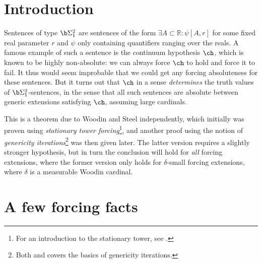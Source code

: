 \newcommand{\mytitle}{$\bf\Sigma^2_1$-absoluteness}
%
%




\section{Introduction}

Sentences of type $\b\Sigma^2_1$ are sentences of the form $\exists A\subset\mathbb R\colon\psi[A,r]$ for some fixed real parameter $r$ and $\psi$ only containing quantifiers ranging over the reals. A famous example of such a sentence is the continuum hypothesis $\ch$, which is known to be highly non-absolute: we can always force $\ch$ to hold and force it to fail. It thus would seem improbable that we could get any forcing absoluteness for these sentences. But it turns out that $\ch$ in a sense \textit{determines} the truth values of $\b\Sigma^2_1$-sentences, in the sense that all such sentences are absolute between generic extensions satisfying $\ch$, assuming large cardinals.

\qquad This is a theorem due to Woodin and Steel independently, which initially was proven using \textit{stationary tower forcing}\footnote{For an introduction to the stationary tower, see \cite{Larson}.}, and another proof using the notion of \textit{genericity iterations}\footnote{Both \cite{Steel} and \cite{Farah} covers the basics of genericity iterations.} was then given later. The latter version requires a slightly stronger hypothesis, but in turn the conclusion will hold for \textit{all} forcing extensions, where the former version only holds for $\delta$-small forcing extensions, where $\delta$ is a measurable Woodin cardinal.

\section{A few forcing facts}

